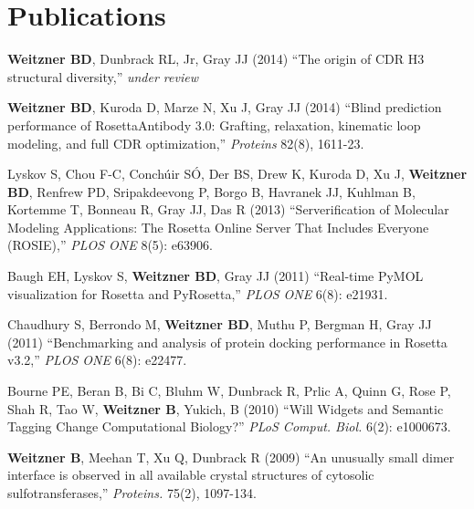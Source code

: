 \documentclass[12pt]{scrartcl}
\newcommand{\allcapsspacing}[1]{{\addfontfeature{LetterSpace=7.5}#1}}
\begin{document}
\section*{\allcapsspacing{Publications}}
\noindent \textbf{Weitzner BD}, Dunbrack RL, Jr, Gray JJ (2014) ``The origin of CDR H3 structural diversity,'' \textit{under review} 

\vspace{0.75\baselineskip}

\noindent \textbf{Weitzner BD}, Kuroda D, Marze N, Xu J, Gray JJ (2014) ``Blind prediction performance of RosettaAntibody 3.0: Grafting, relaxation, kinematic loop modeling, and full CDR optimization,'' \textit{Proteins} 82(8), 1611-23. 

\vspace{0.75\baselineskip}

\noindent Lyskov S, Chou F-C, Conch{\'u}ir S{\'O}, Der BS, Drew K, Kuroda D, Xu J, \textbf{Weitzner BD}, Renfrew PD, Sripakdeevong P, Borgo B, Havranek JJ, Kuhlman B, Kortemme T, Bonneau R, Gray JJ, Das R (2013) ``Serverification of Molecular Modeling Applications: The Rosetta Online Server That Includes Everyone (ROSIE),'' \textit{PLOS ONE} 8(5): e63906.

\vspace{0.75\baselineskip}

\noindent Baugh EH, Lyskov S, \textbf{Weitzner BD}, Gray JJ (2011) ``Real-time PyMOL visualization for Rosetta and PyRosetta,'' \textit{PLOS ONE} 6(8): e21931.

\vspace{0.75\baselineskip}

\noindent Chaudhury S, Berrondo M, \textbf{Weitzner BD}, Muthu P, Bergman H, Gray JJ (2011) ``Benchmarking and analysis of protein docking performance in Rosetta v3.2,'' \textit{PLOS ONE} 6(8): e22477.

\vspace{0.75\baselineskip}

\noindent Bourne PE, Beran B, Bi C, Bluhm W, Dunbrack R, Prlic A, Quinn G, Rose P, Shah R, Tao W, \textbf{Weitzner B}, Yukich, B (2010) ``Will Widgets and Semantic Tagging Change Computational Biology?'' \textit{PLoS Comput. Biol.} 6(2): e1000673.

\vspace{0.75\baselineskip}

\noindent\textbf{Weitzner B}, Meehan T, Xu Q, Dunbrack R (2009) ``An unusually small dimer interface is observed in all available crystal structures of cytosolic sulfotransferases,'' \textit{Proteins.} 75(2), 1097-134.
\end{document}
